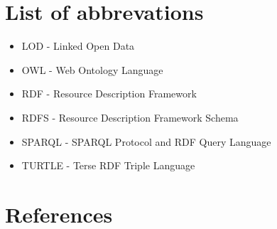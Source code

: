 \documentclass[12pt, a4paper]{report}
\begin{document}


\setcounter{page}{0}



\chapter*{List of abbrevations}

\begin{itemize}
    \item[ ] LOD - Linked Open Data
    \item[ ] OWL - Web Ontology Language
    \item[ ] RDF - Resource Description Framework
    \item[ ] RDFS - Resource Description Framework Schema
    \item[ ] SPARQL - SPARQL Protocol and RDF Query Language
    \item[ ] TURTLE - Terse RDF Triple Language

\end{itemize}


\tableofcontents
\cleardoublepage

\setcounter{page}{0}
\clearpage








\chapter*{References}
\printbibliography[heading=none]


\end{document}
